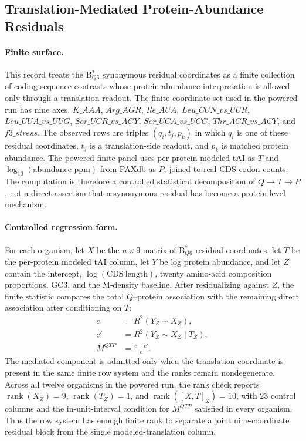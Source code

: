 \subsection{Translation-Mediated Protein-Abundance Residuals}\label{sec:q6-translation-mediated-protein-abundance-cross-layer}

\paragraph{Finite surface.}
This record treats the B$^{\ast}_{Q6}$ synonymous residual coordinates as a finite collection of coding-sequence contrasts whose protein-abundance interpretation is allowed only through a translation readout.  The finite coordinate set used in the powered run has nine axes,
$K\_AAA$, $Arg\_AGR$, $Ile\_AUA$, $Leu\_CUN\_vs\_UUR$, $Leu\_UUA\_vs\_UUG$, $Ser\_UCR\_vs\_AGY$, $Ser\_UCA\_vs\_UCG$, $Thr\_ACR\_vs\_ACY$, and $f3\_stress$.  The observed rows are triples $(q_i,t_j,p_k)$ in which $q_i$ is one of these residual coordinates, $t_j$ is a translation-side readout, and $p_k$ is matched protein abundance.  The powered finite panel uses per-protein modeled tAI as $T$ and $\log_{10}(\mathrm{abundance\_ppm})$ from PAXdb as $P$, joined to real CDS codon counts.  The computation is therefore a controlled statistical decomposition of $Q \to T \to P$, not a direct assertion that a synonymous residual has become a protein-level mechanism.

\paragraph{Controlled regression form.}
For each organism, let $X$ be the $n\times 9$ matrix of B$^{\ast}_{Q6}$ residual coordinates, let $T$ be the per-protein modeled tAI column, let $Y$ be log protein abundance, and let $Z$ contain the intercept, $\log(\mathrm{CDS\ length})$, twenty amino-acid composition proportions, GC3, and the M-density baseline.  After residualizing against $Z$, the finite statistic compares the total $Q$--protein association with the remaining direct association after conditioning on $T$:
$$
\begin{aligned}
  c &= R^2(Y_Z\sim X_Z),\\
  c' &= R^2(Y_Z\sim X_Z\mid T_Z),\\
  M^{QTP} &= \frac{c-c'}{c}.
\end{aligned}
$$
The mediated component is admitted only when the translation coordinate is present in the same finite row system and the ranks remain nondegenerate.  Across all twelve organisms in the powered run, the rank check reports $\operatorname{rank}(X_Z)=9$, $\operatorname{rank}(T_Z)=1$, and $\operatorname{rank}([X,T]_Z)=10$, with $23$ control columns and the in-unit-interval condition for $M^{QTP}$ satisfied in every organism.  Thus the row system has enough finite rank to separate a joint nine-coordinate residual block from the single modeled-translation column.

